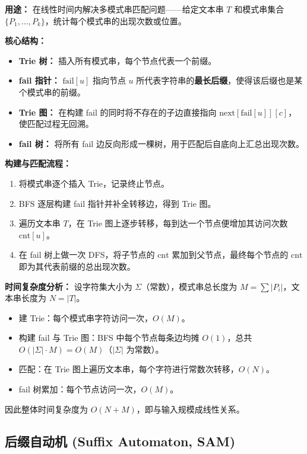 \textbf{用途：} 在线性时间内解决多模式串匹配问题——给定文本串 $T$ 和模式串集合 $\{P_1,\dots,P_k\}$，统计每个模式串的出现次数或位置。

\textbf{核心结构：}
\begin{itemize}
  \item \textbf{Trie 树：} 插入所有模式串，每个节点代表一个前缀。
  \item \textbf{fail 指针：} $\text{fail}[u]$ 指向节点 $u$ 所代表字符串的\textbf{最长后缀}，使得该后缀也是某个模式串的前缀。
  \item \textbf{Trie 图：} 在构建 fail 的同时将不存在的子边直接指向 $\text{next}[\text{fail}[u]][c]$，使匹配过程无回溯。
  \item \textbf{fail 树：} 将所有 fail 边反向形成一棵树，用于匹配后自底向上汇总出现次数。
\end{itemize}

\textbf{构建与匹配流程：}
\begin{enumerate}
  \item 将模式串逐个插入 Trie，记录终止节点。
  \item BFS 逐层构建 fail 指针并补全转移边，得到 Trie 图。
  \item 遍历文本串 $T$，在 Trie 图上逐步转移，每到达一个节点便增加其访问次数 $\text{cnt}[u]$。
  \item 在 fail 树上做一次 DFS，将子节点的 $\text{cnt}$ 累加到父节点，最终每个节点的 $\text{cnt}$ 即为其代表前缀的总出现次数。
\end{enumerate}

\textbf{时间复杂度分析：}
设字符集大小为 $\Sigma$（常数），模式串总长度为 $M = \sum |P_i|$，文本串长度为 $N = |T|$。
\begin{itemize}
  \item 建 Trie：每个模式串字符访问一次，$O(M)$。
  \item 构建 fail 与 Trie 图：BFS 中每个节点每条边均摊 $O(1)$，总共 $O(|\Sigma| \cdot M) = O(M)$（$|\Sigma|$ 为常数）。
  \item 匹配：在 Trie 图上遍历文本串，每个字符进行常数次转移，$O(N)$。
  \item fail 树累加：每个节点访问一次，$O(M)$。
\end{itemize}
因此整体时间复杂度为 $O(N + M)$，即与输入规模成线性关系。



\subsection{后缀自动机 (Suffix Automaton, SAM)}

